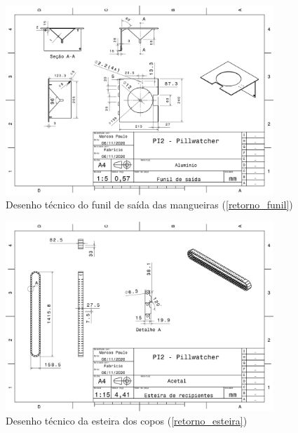 \begin{apendicesenv}
\begin{figure}[H]
    \centering
    \includegraphics[width=0.9\textwidth]{figuras/estrutura/Desenhos/FunildeSaida.pdf}
    \caption{Desenho técnico do funil de saída das mangueiras (\ref{retorno_funil})}
    \label{fig:funil}
\end{figure}

\begin{figure}[H]
    \centering
    \includegraphics[width=0.9\textwidth]{figuras/estrutura/Desenhos/Esteira.pdf}
    \caption{Desenho técnico da esteira dos copos (\ref{retorno_esteira})}
    \label{fig:esteira}
\end{figure}


\end{apendicesenv}
